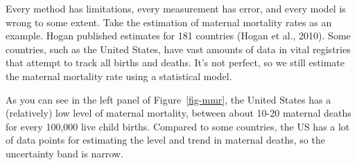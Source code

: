 \documentclass[
  letterpaper,
  DIV=11,
  numbers=noendperiod,
  oneside]{scrreprt}
\begin{document}
Every method has limitations, every measurement has error, and every
model is wrong to some extent. Take the estimation of maternal mortality
rates as an example. Hogan published estimates for 181 countries (Hogan
et al.,
2010).
Some countries, such as the United States, have vast amounts of data in
vital registries that attempt to track all births and deaths. It's not
perfect, so we still estimate the maternal mortality rate using a
statistical model.


As you can see in the left panel of Figure~\ref{fig-mmr}, the United
States has a (relatively) low level of maternal mortality, between about
10-20 maternal deaths for every 100,000 live child births. Compared to
some countries, the US has a lot of data points for estimating the level
and trend in maternal deaths, so the uncertainty band is narrow.
\end{document}
